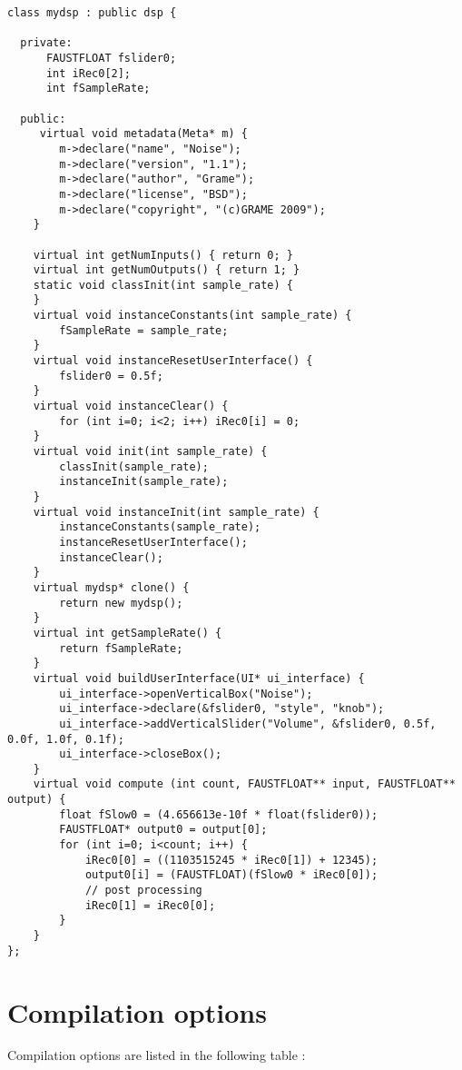 \begin{lstlisting}[basicstyle=\ttfamily\footnotesize\color{yotxt}]
class mydsp : public dsp {

  private:
      FAUSTFLOAT fslider0;
      int iRec0[2];
      int fSampleRate;

  public:
     virtual void metadata(Meta* m) { 
        m->declare("name", "Noise");
        m->declare("version", "1.1");
        m->declare("author", "Grame");
        m->declare("license", "BSD");
        m->declare("copyright", "(c)GRAME 2009");
    }

    virtual int getNumInputs() { return 0; }
    virtual int getNumOutputs() { return 1; }
    static void classInit(int sample_rate) {
    }
    virtual void instanceConstants(int sample_rate) {
        fSampleRate = sample_rate;
    }
    virtual void instanceResetUserInterface() {
        fslider0 = 0.5f;
    }
    virtual void instanceClear() {
        for (int i=0; i<2; i++) iRec0[i] = 0;
    }
    virtual void init(int sample_rate) {
        classInit(sample_rate);
        instanceInit(sample_rate);
    }
    virtual void instanceInit(int sample_rate) {
        instanceConstants(sample_rate);
        instanceResetUserInterface();
        instanceClear();
    }
    virtual mydsp* clone() {
        return new mydsp();
    }
    virtual int getSampleRate() {
        return fSampleRate;
    }
    virtual void buildUserInterface(UI* ui_interface) {
        ui_interface->openVerticalBox("Noise");
        ui_interface->declare(&fslider0, "style", "knob");
        ui_interface->addVerticalSlider("Volume", &fslider0, 0.5f, 0.0f, 1.0f, 0.1f);
        ui_interface->closeBox();
    }
    virtual void compute (int count, FAUSTFLOAT** input, FAUSTFLOAT** output) {
        float fSlow0 = (4.656613e-10f * float(fslider0));
        FAUSTFLOAT* output0 = output[0];
        for (int i=0; i<count; i++) {
            iRec0[0] = ((1103515245 * iRec0[1]) + 12345);
            output0[i] = (FAUSTFLOAT)(fSlow0 * iRec0[0]);
            // post processing
            iRec0[1] = iRec0[0];
        }
    }
};
\end{lstlisting} 

\section{Compilation options}
Compilation options are listed in the following table :

\bigskip

\small

